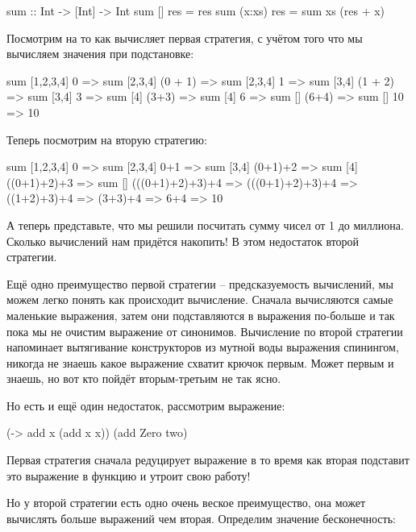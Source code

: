 \begin{code}
sum :: Int -> [Int] -> Int
sum []      res = res
sum (x:xs)  res = sum xs (res + x) 
\end{code}

Посмотрим на то как вычисляет первая стратегия, с учётом
того что мы вычисляем значения при подстановке:

\begin{code}
        sum [1,2,3,4] 0
=>      sum [2,3,4]   (0 + 1)    
=>      sum [2,3,4]   1
=>      sum [3,4]     (1 + 2)
=>      sum [3,4]     3
=>      sum [4]       (3+3)
=>      sum [4]       6
=>      sum []        (6+4)
=>      sum []        10
=>      10
\end{code}

Теперь посмотрим на вторую стратегию:

\begin{code}
        sum [1,2,3,4] 0
=>      sum [2,3,4]   0+1
=>      sum [3,4]     (0+1)+2
=>      sum [4]       ((0+1)+2)+3
=>      sum []        (((0+1)+2)+3)+4
=>      (((0+1)+2)+3)+4
=>      ((1+2)+3)+4
=>      (3+3)+4
=>      6+4
=>      10
\end{code}

А теперь представьте, что мы решили посчитать сумму чисел
от 1 до миллиона. Сколько вычислений нам придётся накопить!
В этом недостаток второй стратегии. 

Ещё одно преимущество первой стратегии -- предсказуемость
вычислений, мы можем легко понять как происходит вычисление.
Сначала вычисляются самые маленькие выражения, затем они подставляются
в выражения по-больше и так пока мы не очистим выражение от синонимов.
Вычисление по второй стратегии напоминает вытягивание конструкторов
из мутной воды выражения спинингом, никогда не знаешь какое выражение схватит
крючок первым. Может первым и знаешь, но вот кто пойдёт вторым-третьим 
не так ясно.

Но есть и ещё один недостаток, рассмотрим выражение:

\begin{code}
(\x -> add x (add x x)) (add Zero two)
\end{code}

Первая стратегия сначала редуцирует выражение 
в то время как вторая подставит это выражение в функцию
и утроит свою работу!

Но у второй стратегии есть одно очень веское преимущество,
она может вычислять больше выражений чем вторая. Определим 
значение бесконечность:


